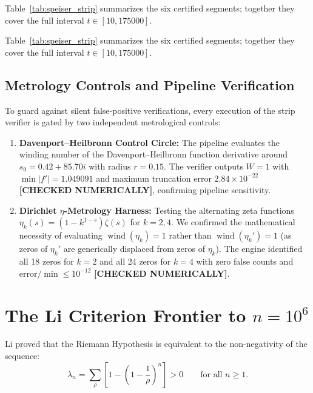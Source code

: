 \documentclass[11pt,a4paper]{article}
\theoremstyle{remark}
\begin{document}
Table~\ref{tab:speiser_strip} summarizes the six certified segments; together they cover the full interval $t \in [10, 175000]$.

Table~\ref{tab:speiser_strip} summarizes the six certified segments; together they cover the full interval $t \in [10, 175000]$.

\subsection{Metrology Controls and Pipeline Verification}
To guard against silent false-positive verifications, every execution of the strip verifier is gated by two independent metrological controls:
\begin{enumerate}
\item \textbf{Davenport--Heilbronn Control Circle:} The pipeline evaluates the winding number of the Davenport--Heilbronn function derivative around $s_0 = 0.42 + 85.70i$ with radius $r = 0.15$. The verifier outputs $W = 1$ with $\min |f'| = 1.049091$ and maximum truncation error $2.84 \times 10^{-22}$ \textbf{[CHECKED NUMERICALLY]}, confirming pipeline sensitivity.
\item \textbf{Dirichlet $\eta$-Metrology Harness:} Testing the alternating zeta functions $\eta_k(s) = (1 - k^{1-s})\zeta(s)$ for $k=2,4$. We confirmed the mathematical necessity of evaluating $\operatorname{wind}(\eta_k) = 1$ rather than $\operatorname{wind}(\eta_k') = 1$ (as zeros of $\eta_k'$ are generically displaced from zeros of $\eta_k$). The engine identified all 18 zeros for $k=2$ and all 24 zeros for $k=4$ with zero false counts and $\text{error}/\min \le 10^{-12}$ \textbf{[CHECKED NUMERICALLY]}.
\end{enumerate}

\section{The Li Criterion Frontier to $n = 10^6$}

Li \cite{li1997} proved that the Riemann Hypothesis is equivalent to the non-negativity of the sequence:
\begin{equation}
 \lambda_n = \sum_{\rho} \left[ 1 - \left(1 - \frac{1}{\rho}\right)^n \right] > 0 \qquad \text{for all } n \ge 1.
\end{equation}
\end{document}

